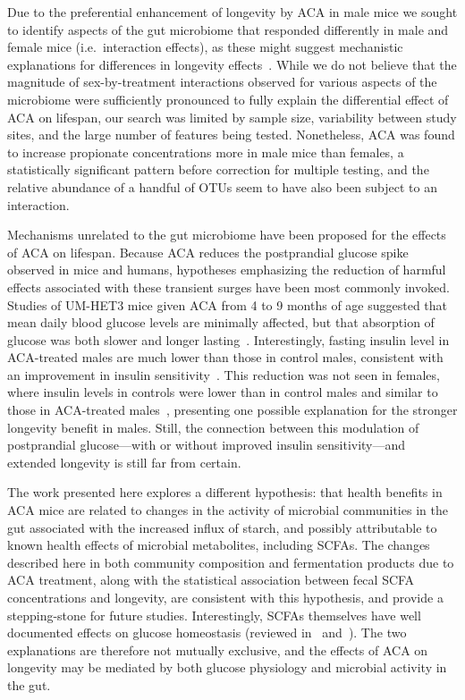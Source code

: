 \documentclass{doc/template/bmcart-nofigbox}
\begin{document}
Due to the preferential enhancement of longevity by ACA in male mice we sought
to identify aspects of the gut microbiome that responded differently in male
and female mice (i.e.~interaction effects), as these might suggest mechanistic
explanations for differences in longevity effects~\cite{Harrison2014}.
While we do not believe that the magnitude of sex-by-treatment interactions
observed for various aspects of the microbiome were sufficiently pronounced to
fully explain the differential effect of ACA on lifespan, our search was
limited by sample size, variability between study sites, and the large number
of features being tested.
Nonetheless, ACA was found to increase propionate concentrations more in male
mice than females, a statistically significant pattern before correction for
multiple testing, and the relative abundance of a handful of OTUs seem to have
also been subject to an interaction.

Mechanisms unrelated to the gut microbiome have been proposed for the effects
of ACA on lifespan.
Because ACA reduces the postprandial glucose spike observed in mice and humans,
hypotheses emphasizing the reduction of harmful effects associated with these
transient surges have been most commonly invoked.
Studies of UM-HET3 mice given ACA from 4 to 9 months of age suggested that
mean daily blood glucose levels are minimally affected, but that absorption of
glucose was both slower and longer lasting~\cite{Harrison2014}.
Interestingly, fasting insulin level in ACA-treated males are much lower than
those in control males, consistent with an improvement in insulin
sensitivity~\cite{Harrison2014}.
This reduction was not seen in females, where insulin levels in controls were
lower than in control males and similar to those in ACA-treated
males~\cite{Miller2014, Harrison2014}, presenting one possible explanation for the
stronger longevity benefit in males.
Still, the connection between this modulation of postprandial
glucose---with or without improved insulin sensitivity---and extended
longevity is still far from certain.

The work presented here explores a different hypothesis:
that health benefits in ACA mice are related to changes in the activity
of microbial communities in the gut associated with the increased influx
of starch, and possibly attributable to known health effects of microbial
metabolites, including SCFAs.
The changes described here in both community composition and fermentation
products due to ACA treatment, along with the statistical association between
fecal SCFA concentrations and longevity, are consistent with this hypothesis,
and provide a stepping-stone for future studies.
Interestingly, SCFAs themselves have well documented effects on glucose
homeostasis (reviewed in~\cite{Morrison2016} and~\cite{Canfora2015}).
The two explanations are therefore not mutually exclusive, and
the effects of ACA on longevity may be mediated by both
glucose physiology and microbial activity in the gut.
\end{document}
